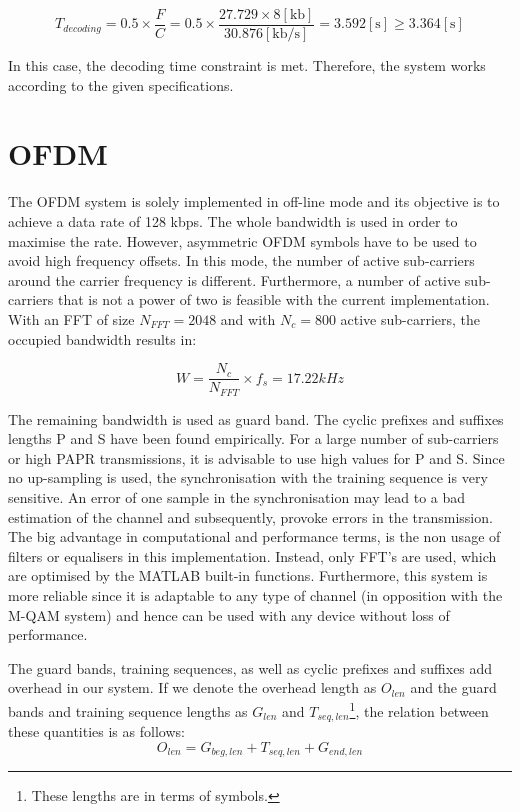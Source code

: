 \documentclass[12pt,a4paper,openright]{report}
\begin{document}
\[
T_{decoding}=0.5\times \frac{F}{C} = 0.5 \times \frac{{27.729 \times 8 \left[ {{\text{kb}}} \right]}}{{30.876\left[ {{\text{kb/s}}} \right]}} = 3.592 \left[ \text{s} \right] \geq 3.364 \left[ \text{s} \right]
\]

In this case, the decoding time constraint is met. Therefore, the system works according to the given specifications.




\section{OFDM}

The OFDM system is solely implemented in off-line mode and its objective is to achieve a data rate of 128 kbps. The whole bandwidth is used in order to maximise the rate. However, asymmetric OFDM symbols have to be used to avoid high frequency offsets. In this mode, the number of active sub-carriers around the carrier frequency is different. Furthermore, a number of active sub-carriers that is not a power of two is feasible with the current implementation. With an FFT of size $N_{FFT}=2048$ and with $N_c=800$ active sub-carriers, the occupied bandwidth results in:

$$W = \frac{N_c}{N_{FFT}}\times f_s = 17.22 kHz $$

The remaining bandwidth is used as guard band. The cyclic prefixes and suffixes lengths P and S have been found empirically. For a large number of sub-carriers or high PAPR transmissions, it is advisable to use high values for P and S. Since no up-sampling is used, the synchronisation with the training sequence is very sensitive. An error of one sample in the synchronisation may lead to a bad estimation of the channel and subsequently, provoke errors in the transmission. The big advantage in computational and performance terms, is the non usage of filters or equalisers in this implementation. Instead, only FFT's are used, which are optimised by the MATLAB built-in functions. Furthermore, this system is more reliable since it is adaptable to any type of channel (in opposition with the M-QAM system) and hence can be used with any device without loss of performance.

The guard bands, training sequences, as well as cyclic prefixes and suffixes add overhead in our system. If we denote the overhead length as $O_{len}$ and the guard bands and training sequence lengths as $G_{len}$ and $T_{seq,len}$\footnote{These lengths are in terms of symbols.}, the relation between these quantities is as follows:
\begin{equation}
O_{len} = G_{beg,len} + T_{seq,len} + G_{end,len}  
\end{equation}
\end{document}
